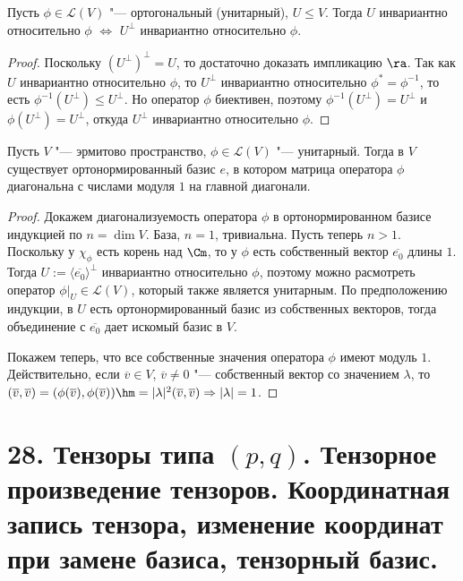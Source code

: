 \begin{proposition}
    Пусть $\phi\in \mathcal{L}(V)$ "--- ортогональный (унитарный), $U \le V$. Тогда $U$ инвариантно относительно $\phi$ $\Leftrightarrow$ $U^\perp$ инвариантно относительно $\phi$.
\end{proposition}

\begin{proof}
    Поскольку $(U^\perp)^\perp = U$, то достаточно доказать импликацию $\ra$. Так как $U$ инвариантно относительно $\phi$, то $U^\perp$ инвариантно относительно $\phi^* = \phi^{-1}$, то есть $\phi^{-1}(U^\perp) \le U^\perp$. Но оператор $\phi$ биективен, поэтому $\phi^{-1}(U^\perp) = U^\perp$ и $\phi(U^\perp) = U^\perp$, откуда $U^\perp$ инвариантно относительно $\phi$.
\end{proof}

\begin{theorem}
    Пусть $V$ "--- эрмитово пространство, $\phi \in \mathcal{L}(V)$ "--- унитарный. Тогда в $V$ существует ортонормированный базис $e$, в котором матрица оператора $\phi$ диагональна с числами модуля $1$ на главной диагонали.
\end{theorem}

\begin{proof}
    Докажем диагонализуемость оператора $\phi$ в ортонормированном базисе индукцией по $n = \dim{V}$. База, $n = 1$, тривиальна. Пусть теперь $n > 1$. Поскольку у $\chi_\phi$ есть корень над $\Cm$, то у $\phi$ есть собственный вектор $\overline{e_0}$ длины $1$. Тогда $U := \langle\overline{e_0}\rangle^\perp$ инвариантно относительно $\phi$, поэтому можно расмотреть оператор $\phi|_{U} \in \mathcal{L}(V)$, который также является унитарным. По предположению индукции, в $U$ есть ортонормированный базис из собственных векторов, тогда объединение с $\overline{e_0}$ дает искомый базис в $V$.
    
    Покажем теперь, что все собственные значения оператора $\phi$ имеют модуль $1$. Действительно, если $\overline{v} \in V$, $\overline{v} \ne 0$ "--- собственный вектор со значением $\lambda$, то $(\overline{v}, \overline{v}) = (\phi(\overline{v}), \phi(\overline{v})) \hm= |\lambda|^2(\overline{v}, \overline{v}) \Rightarrow |\lambda| = 1$.
\end{proof}

\section{28. Тензоры типа $(p, q)$. Тензорное произведение тензоров. Координатная запись тензора, изменение координат при замене базиса, тензорный базис.}

